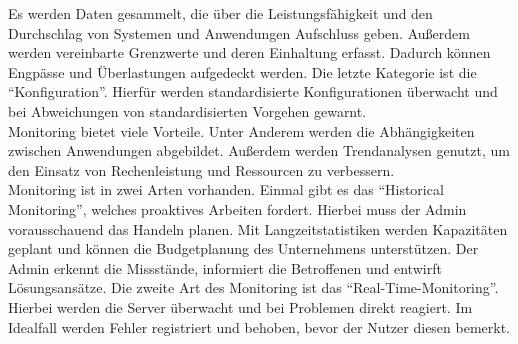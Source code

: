 {    Es werden Daten gesammelt, die über die Leistungsfähigkeit und den Durchschlag von Systemen und Anwendungen Aufschluss geben.
    Außerdem werden vereinbarte Grenzwerte und deren Einhaltung erfasst.
    Dadurch können Engpässe und Überlastungen aufgedeckt werden.
    Die letzte Kategorie ist die \enquote{Konfiguration}.
    Hierfür werden standardisierte Konfigurationen überwacht und bei Abweichungen von standardisierten Vorgehen gewarnt.
    \\
    Monitoring bietet viele Vorteile.
    Unter Anderem werden die Abhängigkeiten zwischen Anwendungen abgebildet.
    Außerdem werden Trendanalysen genutzt, um den Einsatz von Rechenleistung und Ressourcen zu verbessern.
    \\
    Monitoring ist in zwei Arten vorhanden.
    Einmal gibt es das \enquote{Historical Monitoring}, welches proaktives Arbeiten fordert.
    Hierbei muss der Admin vorausschauend das Handeln planen.
    Mit Langzeitstatistiken werden Kapazitäten geplant und können die Budgetplanung des Unternehmens unterstützen.
    Der Admin erkennt die Missstände, informiert die Betroffenen und entwirft Lösungsansätze.
    Die zweite Art des Monitoring ist das \enquote{Real-Time-Monitoring}.
    Hierbei werden die Server überwacht und bei Problemen direkt reagiert.
    Im Idealfall werden Fehler registriert und behoben, bevor der Nutzer diesen bemerkt.
}\autocite{cloudradar, wbs, crossmedia}

